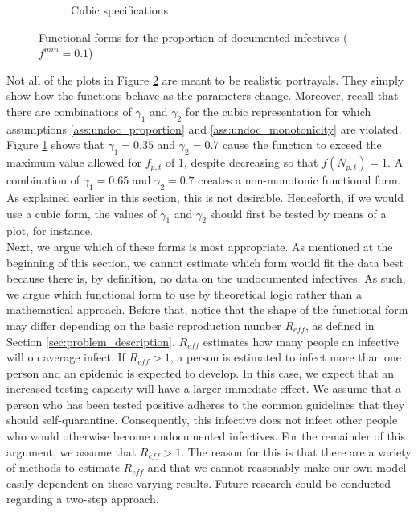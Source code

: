 \documentclass[12pt]{article}
\begin{document}
\begin{figure}[ht]
{\begin{subfigure}[pt]{0.48\linewidth}
	    \caption{Cubic specifications}
	    \label{fig:functional_forms_cubic}
	\end{subfigure}
    }
    
    \caption{Functional forms for the proportion of documented infectives ($f^{min} = 0.1$)}
    \label{fig:functional_forms}
    \end{figure}
    
    Not all of the plots in Figure \ref{fig:functional_forms} are meant to be realistic portrayals. They simply show how the functions behave as the parameters change. Moreover, recall that there are combinations of $\gamma_1$ and $\gamma_2$ for the cubic representation for which assumptions \ref{ass:undoc_proportion} and \ref{ass:undoc_monotonicity} are violated. Figure \ref{fig:functional_forms_cubic} shows that $\gamma_1=0.35$ and $\gamma_2=0.7$ cause the function to exceed the maximum value allowed for $f_{p,t}$ of 1, despite decreasing so that $f(N_{p,t}) = 1$. A combination of $\gamma_1=0.65$ and $\gamma_2=0.7$ creates a non-monotonic functional form. As explained earlier in this section, this is not desirable. Henceforth, if we would use a cubic form, the values of $\gamma_1$ and $\gamma_2$ should first be tested by means of a plot, for instance. \\
    
    Next, we argue which of these forms is most appropriate. As mentioned at the beginning of this section, we cannot estimate which form would fit the data best because there is, by definition, no data on the undocumented infectives. As such, we argue which functional form to use by theoretical logic rather than a mathematical approach. Before that, notice that the shape of the functional form may differ depending on the basic reproduction number $R_{eff}$, as defined in Section \ref{sec:problem_description}. $R_{eff}$ estimates how many people an infective will on average infect. If $R_{eff} > 1$, a person is estimated to infect more than one person and an epidemic is expected to develop. In this case, we expect that an increased testing capacity will have a larger immediate effect. We assume that a person who has been tested positive adheres to the common guidelines that they should self-quarantine. Consequently, this infective does not infect other people who would otherwise become undocumented infectives. For the remainder of this argument, we assume that $R_{eff} > 1$. The reason for this is that there are a variety of methods to estimate $R_{eff}$ and that we cannot reasonably make our own model easily dependent on these varying results. Future research could be conducted regarding a two-step approach. \\
    
\end{document}
